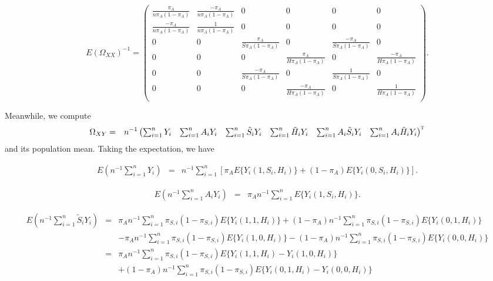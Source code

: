 \documentclass{article}
\def\T{{\textsc{t}}}
\newcommand{\tS}{\tilde{S}}
\newcommand{\tH}{\tilde{H}}
\newcommand{\sumi}{\sum_{i=1}^n}
\begin{document}
\[
E(\Omega_{XX})^{-1} =
\begin{pmatrix}
\frac{\pi_A}{n \pi_A(1 - \pi_A)} & \frac{-\pi_A}{n \pi_A(1 - \pi_A)} & 0 & 0 & 0 & 0 \\
\frac{-\pi_A}{n \pi_A(1 - \pi_A)} & \frac{1}{n \pi_A(1 - \pi_A)} & 0 & 0 & 0 & 0 \\
0 & 0 & \frac{\pi_A}{S \pi_A(1 - \pi_A)} & 0 & \frac{-\pi_A}{S \pi_A(1 - \pi_A)} & 0 \\
0 & 0 & 0 & \frac{\pi_A}{H \pi_A(1 - \pi_A)} & 0 & \frac{-\pi_A}{H \pi_A(1 - \pi_A)} \\
0 & 0 & \frac{-\pi_A}{S \pi_A(1 - \pi_A)} & 0 & \frac{1}{S \pi_A(1 - \pi_A)} & 0 \\
0 & 0 & 0 & \frac{-\pi_A}{H \pi_A(1 - \pi_A)} & 0 & \frac{1}{H \pi_A(1 - \pi_A)} \\
\end{pmatrix}.
\]




Meanwhile, we compute
\begin{eqnarray*}
    \Omega_{XY} &=& n^{-1}
\begin{pmatrix}
    \sumi Y_i & \sumi A_i Y_i & \sumi \tS_i Y_i & \sumi \tH_i Y_i & \sumi A_i \tS_i Y_i & \sumi A_i \tH_i Y_i
\end{pmatrix}^{\T}
\end{eqnarray*}
and its population mean. Taking the expectation, we have

\begin{eqnarray*}
    E\left(n^{-1}\sumi Y_i \right) &=& n^{-1}\sumi \left[\pi_A E\{Y_i(1,S_i,H_i)\}+(1-\pi_A)E\{Y_i(0,S_i,H_i)\} \right].
\end{eqnarray*}

\begin{eqnarray*}
    E\left(n^{-1}\sumi A_i Y_i \right) &=& \pi_A n^{-1}\sumi E\{Y_i(1, S_i,H_i)\}.
\end{eqnarray*}

\begin{eqnarray*}
    E\left(n^{-1}\sumi \tS_i Y_i \right) &=& \pi_A n^{-1}\sumi \pi_{S,i}(1-\pi_{S,i})E\{Y_i(1,1,H_i)\} + (1-\pi_A) n^{-1}\sumi \pi_{S,i}(1-\pi_{S,i})E\{Y_i(0,1,H_i)\} \\
    &&- \pi_A n^{-1}\sumi \pi_{S,i}(1-\pi_{S,i})E\{Y_i(1,0,H_i)\} - (1-\pi_A) n^{-1}\sumi \pi_{S,i}(1-\pi_{S,i})E\{Y_i(0,0,H_i)\} \\
    &=& \pi_A n^{-1}\sumi \pi_{S,i}(1-\pi_{S,i}) E\{Y_i(1,1,H_i) - Y_i(1,0,H_i)\} \\
    &&+ (1-\pi_A) n^{-1}\sumi \pi_{S,i}(1-\pi_{S,i}) E\{Y_i(0,1,H_i) - Y_i(0,0,H_i)\}
\end{eqnarray*}
\end{document}
